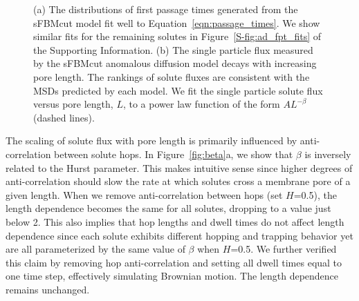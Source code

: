 \documentclass[journal=jctcce,manuscript=article]{achemso}
\begin{document}
\begin{figure}
\begin{subfigure}{0.485\textwidth}
  \caption{}\label{fig:flux_curves_ad}
  \end{subfigure}
  \caption{(a) The distributions of first passage times generated from the
	  sFBMcut model fit well to Equation~\ref{eqn:passage_times}. We show
	  similar fits for the remaining solutes in
	  Figure~\ref{S-fig:ad_fpt_fits} of the Supporting Information. (b) The
	  single particle flux measured by the sFBMcut anomalous diffusion model
	  decays with increasing pore length. The rankings of solute fluxes are consistent
	  with the MSDs predicted by each model. We fit the single particle
	  solute flux versus pore length, $L$, to a power law function of the
	  form $AL^{-\beta}$ (dashed lines). 
  }\label{fig:flux_curves}
  \end{figure}

  The scaling of solute flux with pore length is primarily influenced by
  anti-correlation between solute hops. In Figure~\ref{fig:beta}a, we show that
  $\beta$ is inversely related to the Hurst parameter. This makes intuitive
  sense since higher degrees of anti-correlation should slow the rate at which
  solutes cross a membrane pore of a given length. When we remove anti-correlation between
  hops (set $H$=0.5), the length dependence becomes the same for all solutes,
  dropping to a value just below 2. This also implies that hop lengths and
  dwell times do not affect length dependence since each solute exhibits
  different hopping and trapping behavior yet are all parameterized by the same
  value of $\beta$ when $H$=0.5. We further verified this claim by removing
  hop anti-correlation and setting all dwell times equal to one time step,
  effectively simulating Brownian motion.  The length dependence remains
  unchanged. 
\end{document}
